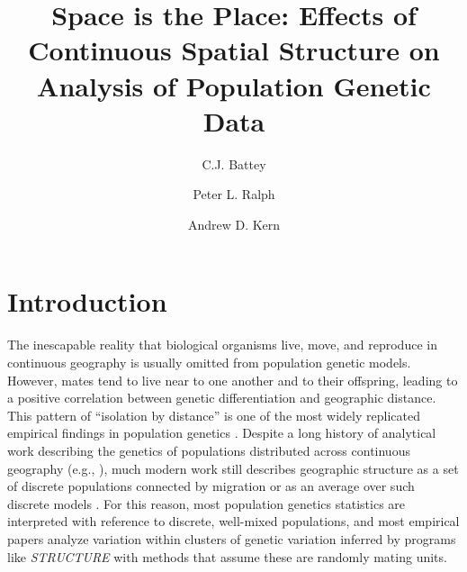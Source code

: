 \documentclass[10pt,twoside,lineno,hidelinks]{preprint}
\title{Space is the Place: Effects of Continuous Spatial Structure on Analysis of Population Genetic Data}
\author[$\ast$,1]{C.J. Battey}
\author[$\ast, \dagger$]{Peter L. Ralph}
\author[$\ast, \dagger$]{Andrew D. Kern}
\affil[$\ast$]{University of Oregon Dept. Biology, Institute for Ecology Evolution}
\begin{document}
\maketitle
\thispagestyle{firststyle}
\firstpagefootnote


\vspace{-35pt}%

\section{Introduction}

The inescapable reality that biological organisms live, move, and reproduce in continuous geography is usually omitted from population genetic models. However, mates tend to live near to one another and to their offspring, leading to a positive correlation between genetic differentiation and geographic distance. This pattern of ``isolation by distance'' \citep{Wright1943} is one of the most widely replicated empirical findings in population genetics \citep{Chen2017,Jay2012,Sharbel2000}.
Despite a long history of analytical work describing the genetics of populations distributed across continuous geography
(e.g., \citet{Wright1943,Rousset1997,barton2002neutral,Barton2010,Ringbauer2017,robledoarnuncio2010isolation,Wilkins2002linearcoalescent,wilkins2004separation}), 
much modern work still describes geographic structure as a set of discrete populations connected by migration \citep[e.g.,][]{Wright1931,epperson2003geographical,rousset2011likelihoodbased,Shirk2014,lundgren2019populations} or as an average over such discrete models \citep{Petkova2015,al2019estimating}. 
For this reason, most population genetics statistics are interpreted with reference to discrete, well-mixed populations, and most empirical papers analyze variation within clusters of genetic variation inferred by programs like \textit{STRUCTURE} \citep{Pritchard2000} with methods that assume these are randomly mating units.
\end{document}
